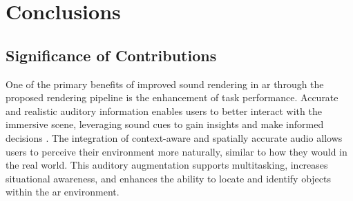 \section{Conclusions}
\subsection{Significance of Contributions}
One of the primary benefits of improved sound rendering in \acrshort{ar} through the proposed rendering pipeline is the enhancement of task performance. Accurate and realistic auditory information enables users to better interact with the immersive scene, leveraging sound cues to gain insights and make informed decisions \citep{rubio2017immersive,zimmons2003influence}. The integration of context-aware and spatially accurate audio allows users to perceive their environment more naturally, similar to how they would in the real world. This auditory augmentation supports multitasking, increases situational awareness, and enhances the ability to locate and identify objects within the \acrshort{ar} environment. 

